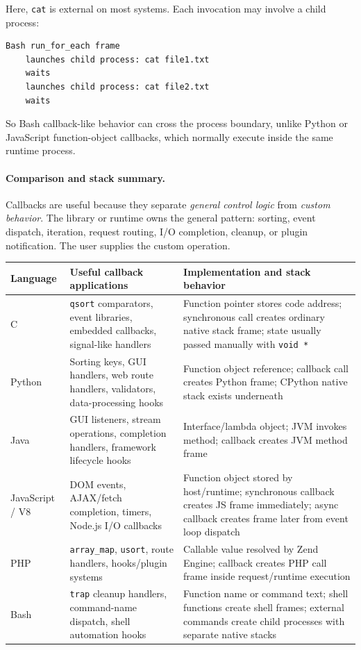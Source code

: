 \documentclass[a4paper,twoside]{report}
\begin{document}
Here, \texttt{cat} is external on most systems. Each invocation may involve a child process:

\begin{verbatim}
Bash run_for_each frame
    launches child process: cat file1.txt
    waits
    launches child process: cat file2.txt
    waits
\end{verbatim}

So Bash callback-like behavior can cross the process boundary, unlike Python or JavaScript function-object callbacks, which normally execute inside the same runtime process.

\paragraph{Comparison and stack summary.}

Callbacks are useful because they separate \emph{general control logic} from \emph{custom behavior}. The library or runtime owns the general pattern: sorting, event dispatch, iteration, request routing, I/O completion, cleanup, or plugin notification. The user supplies the custom operation.

\begin{center}
\begin{tabular}{|p{}|p{}|p{}|}
\hline
\textbf{Language} & \textbf{Useful callback applications} & \textbf{Implementation and stack behavior} \\
\hline
C & \texttt{qsort} comparators, event libraries, embedded callbacks, signal-like handlers & Function pointer stores code address; synchronous call creates ordinary native stack frame; state usually passed manually with \texttt{void *} \\
\hline
Python & Sorting keys, GUI handlers, web route handlers, validators, data-processing hooks & Function object reference; callback call creates Python frame; CPython native stack exists underneath \\
\hline
Java & GUI listeners, stream operations, completion handlers, framework lifecycle hooks & Interface/lambda object; JVM invokes method; callback creates JVM method frame \\
\hline
JavaScript / V8 & DOM events, AJAX/fetch completion, timers, Node.js I/O callbacks & Function object stored by host/runtime; synchronous callback creates JS frame immediately; async callback creates frame later from event loop dispatch \\
\hline
PHP & \texttt{array\_map}, \texttt{usort}, route handlers, hooks/plugin systems & Callable value resolved by Zend Engine; callback creates PHP call frame inside request/runtime execution \\
\hline
Bash & \texttt{trap} cleanup handlers, command-name dispatch, shell automation hooks & Function name or command text; shell functions create shell frames; external commands create child processes with separate native stacks \\
\hline
\end{tabular}
\end{center}
\end{document}
